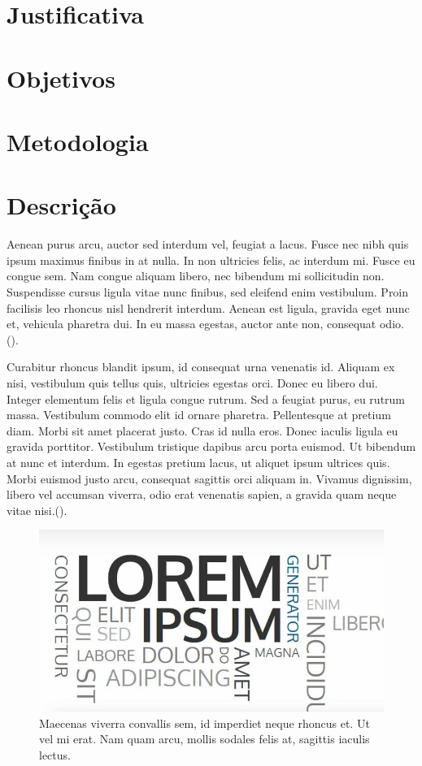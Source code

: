 \section{Justificativa}
\section{Objetivos}
\section{Metodologia}
\section{Descrição}

Aenean purus arcu, auctor sed interdum vel, feugiat a lacus. Fusce nec nibh quis ipsum maximus finibus in at nulla. In non ultricies felis, ac interdum mi. Fusce eu congue sem. Nam congue aliquam libero, nec bibendum mi sollicitudin non. Suspendisse cursus ligula vitae nunc finibus, sed eleifend enim vestibulum. Proin facilisis leo rhoncus nisl hendrerit interdum. Aenean est ligula, gravida eget nunc et, vehicula pharetra dui. In eu massa egestas, auctor ante non, consequat odio. (\cite{alvim2007}).

Curabitur rhoncus blandit ipsum, id consequat urna venenatis id. Aliquam ex nisi, vestibulum quis tellus quis, ultricies egestas orci. Donec eu libero dui. Integer elementum felis et ligula congue rutrum. Sed a feugiat purus, eu rutrum massa. Vestibulum commodo elit id ornare pharetra. Pellentesque at pretium diam. Morbi sit amet placerat justo. Cras id nulla eros. Donec iaculis ligula eu gravida porttitor. Vestibulum tristique dapibus arcu porta euismod. Ut bibendum at nunc et interdum. In egestas pretium lacus, ut aliquet ipsum ultrices quis. Morbi euismod justo arcu, consequat sagittis orci aliquam in. Vivamus dignissim, libero vel accumsan viverra, odio erat venenatis sapien, a gravida quam neque vitae nisi.(\cite{mme2020}). 

\begin{figure}[H]
    \centering
    \includegraphics[width=0.5\linewidth]{Imagens/chap01/loren-ipsum-cover.jpg}
    \caption{Maecenas viverra convallis sem, id imperdiet neque rhoncus et. Ut vel mi erat. Nam quam arcu, mollis sodales felis at, sagittis iaculis lectus.}
    \label{fig:lorem_ipsum}
\end{figure}

